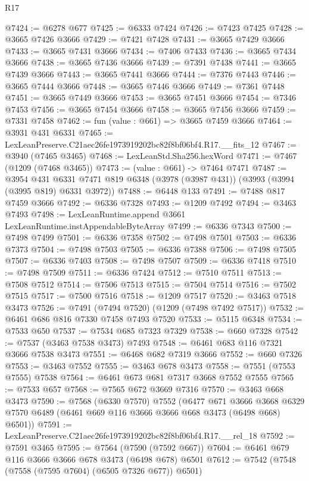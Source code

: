 \begin{lexlean}{R17}
\begin{coremodule}
@7424 := @6278 @677
@7425 := @6333 @7424
@7426 := @7423 @7425
@7428 := @3665 @7426 @3666
@7429 := @7421 @7428
@7431 := @3665 @7429 @3666
@7433 := @3665 @7431 @3666
@7434 := @7406 @7433
@7436 := @3665 @7434 @3666
@7438 := @3665 @7436 @3666
@7439 := @7391 @7438
@7441 := @3665 @7439 @3666
@7443 := @3665 @7441 @3666
@7444 := @7376 @7443
@7446 := @3665 @7444 @3666
@7448 := @3665 @7446 @3666
@7449 := @7361 @7448
@7451 := @3665 @7449 @3666
@7453 := @3665 @7451 @3666
@7454 := @7346 @7453
@7456 := @3665 @7454 @3666
@7458 := @3665 @7456 @3666
@7459 := @7331 @7458
@7462 := fun (value : @661) => @3665 @7459 @3666
@7464 := @3931 @431 @6331
@7465 := LexLeanPreserve.C21aec26fe1973919202bc82f8bf06bf4.R17.__fits_12
@7467 := @3940 (@7465 @3465)
@7468 := LexLeanStd.Sha256.hexWord
@7471 := @7467 (@1209 (@7468 @3465))
@7473 := (value : @661) -> @7464 @7471
@7487 := @3954
    @431
    @6331
    @7471
    @819
    @6348
    (@3978 (@3987 @431))
    (@3993 (@3994 (@3995 @819) @6331 @3972))
@7488 := @6448 @133
@7491 := @7488 @817 @7459 @3666
@7492 := @6336 @7328
@7493 := @1209 @7492
@7494 := @3463 @7493
@7498 := LexLeanRuntime.append @3661 LexLeanRuntime.instAppendableByteArray
@7499 := @6336 @7343
@7500 := @7498 @7499
@7501 := @6336 @7358
@7502 := @7498 @7501
@7503 := @6336 @7373
@7504 := @7498 @7503
@7505 := @6336 @7388
@7506 := @7498 @7505
@7507 := @6336 @7403
@7508 := @7498 @7507
@7509 := @6336 @7418
@7510 := @7498 @7509
@7511 := @6336 @7424
@7512 := @7510 @7511
@7513 := @7508 @7512
@7514 := @7506 @7513
@7515 := @7504 @7514
@7516 := @7502 @7515
@7517 := @7500 @7516
@7518 := @1209 @7517
@7520 := @3463 @7518 @3473
@7526 := @7491 (@7494 @7520) (@1209 (@7498 @7492 @7517))
@7532 := @6461 @686 @816 @7330 @7458 @7493 @7520
@7533 := @5115 @6348
@7534 := @7533 @650
@7537 := @7534 @685 @7323 @7329
@7538 := @660 @7328
@7542 := @7537 (@3463 @7538 @3473) @7493
@7548 := @6461 @683 @116 @7321 @3666 @7538 @3473
@7551 := @6468 @682 @7319 @3666
@7552 := @660 @7326
@7553 := @3463 @7552
@7555 := @3463 @678 @3473
@7558 := @7551 (@7553 @7555) @7538
@7564 := @6461 @673 @681 @7317 @3668 @7552 @7555
@7565 := @7533 @657
@7568 := @7565 @672 @3669 @7316
@7570 := @3463 @668 @3473
@7590 := @7568
    (@6330 @7570)
    @7552
    (@6477
      @671
      @3666
      @3668
      @6329
      @7570
      @6489
      (@6461 @669 @116 @3666 @3666 @668 @3473 (@6498 @668) @6501))
@7591 := LexLeanPreserve.C21aec26fe1973919202bc82f8bf06bf4.R17.__rel_18
@7592 := @7591 @3465
@7595 := @7564 (@7590 (@7592 @667))
@7604 := @6461 @679 @116 @3666 @3666 @678 @3473 (@6498 @678) @6501
@7612 := @7542 (@7548 (@7558 (@7595 @7604) (@6505 @7326 @677)) @6501)

\end{coremodule}
\end{lexlean}
